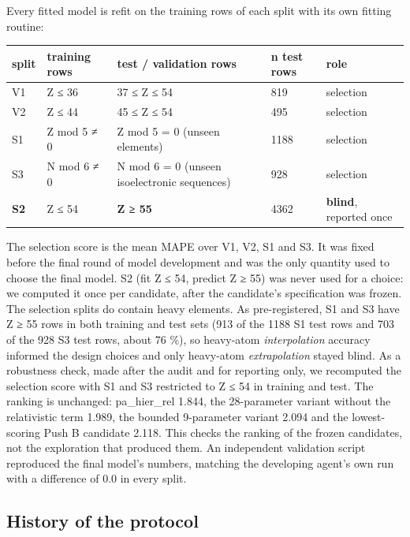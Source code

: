 \documentclass[aps,pra,preprint,superscriptaddress,amsmath,amssymb]{revtex4-2}
\begin{document}
Every fitted model is refit on the training rows of each split with its own fitting routine:


\begin{table}[h]
\footnotesize
\begin{ruledtabular}
\begin{tabular}{lllll}
split & training rows & test / validation rows & n test rows & role \\
\hline
V1 & Z ≤ 36 & 37 ≤ Z ≤ 54 & 819 & selection \\
V2 & Z ≤ 44 & 45 ≤ Z ≤ 54 & 495 & selection \\
S1 & Z mod 5 ≠ 0 & Z mod 5 = 0 (unseen elements) & 1188 & selection \\
S3 & N mod 6 ≠ 0 & N mod 6 = 0 (unseen isoelectronic sequences) & 928 & selection \\
\textbf{S2} & Z ≤ 54 & \textbf{Z ≥ 55} & 4362 & \textbf{blind}, reported once \\
\end{tabular}
\end{ruledtabular}
\end{table}


The selection score is the mean MAPE over V1, V2, S1 and S3. It was fixed before the final round of model development and was the only quantity used to choose the final model. S2 (fit Z ≤ 54, predict Z ≥ 55) was never used for a choice: we computed it once per candidate, after the candidate's specification was frozen. The selection splits do contain heavy elements. As pre-registered, S1 and S3 have Z ≥ 55 rows in both training and test sets (913 of the 1188 S1 test rows and 703 of the 928 S3 test rows, about 76 \%), so heavy-atom \emph{interpolation} accuracy informed the design choices and only heavy-atom \emph{extrapolation} stayed blind. As a robustness check, made after the audit and for reporting only, we recomputed the selection score with S1 and S3 restricted to Z ≤ 54 in training and test. The ranking is unchanged: pa\_hier\_rel 1.844, the 28-parameter variant without the relativistic term 1.989, the bounded 9-parameter variant 2.094 and the lowest-scoring Push B candidate 2.118. This checks the ranking of the frozen candidates, not the exploration that produced them. An independent validation script reproduced the final model's numbers, matching the developing agent's own run with a difference of 0.0 in every split.


\subsection{History of the protocol}
\end{document}
